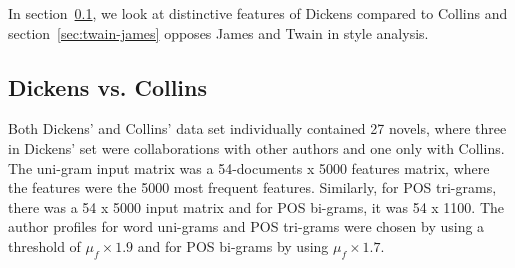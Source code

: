 \documentclass[a4paper,10pt,twoside,fleqn]{article}
\begin{document}
In section~\ref{sec:dickens-collins}, we look at distinctive
features of Dickens compared to Collins and section~\ref{sec:twain-james}
opposes James and Twain in style analysis.

\subsection{Dickens vs. Collins} \label{sec:dickens-collins}
Both Dickens' and Collins' data set individually contained 27 novels,
where three in Dickens' set were collaborations with other authors and
one only with Collins. The uni-gram input matrix was a
54-documents x 5000 features matrix, where the features were
the 5000 most frequent features.
Similarly, for POS tri-grams, there was a 54 x 5000 input matrix and
for POS bi-grams, it was 54 x 1100.
The author profiles for word uni-grams and POS tri-grams were chosen
by using a threshold of $\mu_f \times 1.9$ and for
POS bi-grams by using $\mu_f \times 1.7$.
\end{document}
